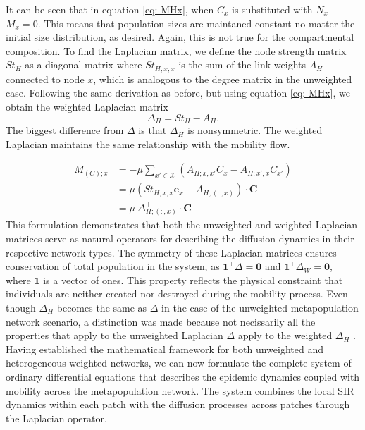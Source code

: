 It can be seen that in equation \ref{eq: MHx}, when $C_x$ is substituted with $N_x$ $M_x=0$. This means that population sizes are maintaned constant no matter the initial size distribution, as desired. Again, this is not true for the compartmental composition. To find the Laplacian matrix, we define the node strength matrix $St_H$ as a diagonal matrix where $St_{H;x,x}$ is the sum of the link weights $A_H$ connected to node $x$, which is analogous to the degree matrix in the unweighted case. Following the same derivation as before, but using equation \ref{eq: MHx}, we obtain the weighted Laplacian matrix 
\begin{equation}
    \Delta_H = St_H - A_H. 
    \label{eq: DeltaH}
\end{equation}
The biggest difference from $\Delta$ is that $\Delta_H$ is nonsymmetric. The weighted Laplacian maintains the same relationship with the mobility flow.

\begin{equation}
    \begin{aligned}
        M_{(C);x} &= -\mu \sum_{x' \in \mathcal{X}} (A_{H;x,x'} C_{x} -  A_{H;x',x} C_{x'})\\
        &= \mu \left( St_{H;x,x} \mathbf{e}_x - A_{H;(:,x)} \right) \cdot \mathbf{C} \\
        &= \mu \ \Delta_{H;(:,x)}^{\top} \cdot \mathbf{C}
    \end{aligned}
\end{equation}
This formulation demonstrates that both the unweighted and weighted Laplacian matrices serve as natural operators for describing the diffusion dynamics in their respective network types. The symmetry of these Laplacian matrices ensures conservation of total population in the system, as $\mathbf{1}^{\top}\Delta = \mathbf{0}$ and $\mathbf{1}^{\top}\Delta_W = \mathbf{0}$, where $\mathbf{1}$ is a vector of ones. This property reflects the physical constraint that individuals are neither created nor destroyed during the mobility process. Even though $\Delta_H$ becomes the same as $\Delta$ in the case of the unweighted metapopulation network scenario, a distinction was made because not necissarily all the properties that apply to the unweighted Laplacian $\Delta$ apply to the weighted $\Delta_H$ \cite{10.1093/comnet/cnab032}.
\\


Having established the mathematical framework for both unweighted and heterogeneous weighted networks, we can now formulate the complete system of ordinary differential equations that describes the epidemic dynamics coupled with mobility across the metapopulation network. The system combines the local SIR dynamics within each patch with the diffusion processes across patches through the Laplacian operator.

